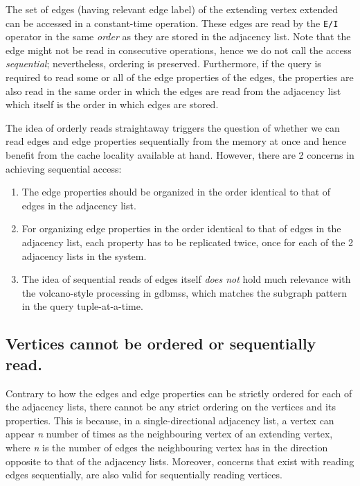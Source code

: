 \label{ssec:edges-ordered}
\begin{guideline}
The set of edges (having relevant edge label) of the extending vertex extended can be accessed in a constant-time operation. These edges are read by the \texttt{E/I} operator in the same \emph{order} as they are stored in the adjacency list. Note that the edge might not be read in consecutive operations, hence we do not call the access \emph{sequential}; nevertheless, ordering is preserved. Furthermore, if the query is required to read some or all of the edge properties of the edges, the properties are also read in the same order in which the edges are read from the adjacency list which itself is the order in which edges are stored.

The idea of orderly reads straightaway triggers the question of whether we can read edges and edge properties sequentially from the memory at once and hence benefit from the cache locality available at hand. However, there are 2 concerns in achieving sequential access: 

\begin{enumerate}
	
	\item The edge properties should be organized in the order identical to that of edges in the adjacency list.
	
	\item For organizing edge properties in the order identical to that of edges in the adjacency list, each property has to be replicated twice, once for each of the 2 adjacency lists in the system.
	
	\item The idea of sequential reads of edges itself \emph{does not} hold much relevance with the volcano-style processing in \gls{gdbms}s, which matches the subgraph pattern in the query tuple-at-a-time.
	
\end{enumerate}

\end{guideline}

\subsection{Vertices cannot be ordered or sequentially read.}
\label{gdln:vertices-unordered}

Contrary to how the edges and edge properties can be strictly ordered for each of the adjacency lists, there cannot be any strict ordering on the vertices and its properties. This is because, in a single-directional adjacency list, a vertex can appear \textit{n} number of times as the neighbouring vertex of an extending vertex, where \textit{n} is the number of edges the neighbouring vertex has in the direction opposite to that of the adjacency lists. Moreover, concerns that exist with reading edges sequentially, are also valid for sequentially reading vertices.


